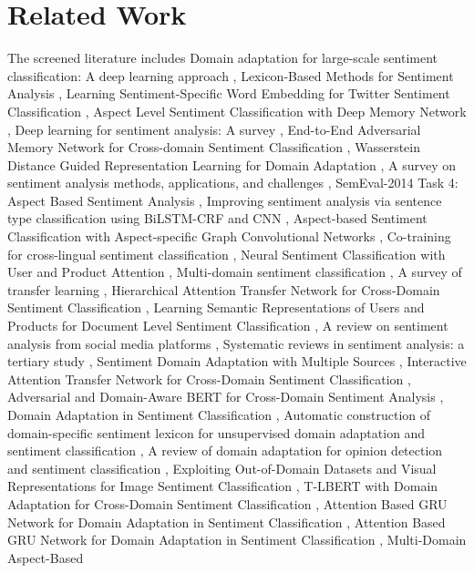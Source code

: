 \documentclass{article}
\begin{document}
\section{Related Work}
The screened literature includes Domain adaptation for large-scale sentiment classification: A deep learning approach \cite{glorot2011domainb905a703}, Lexicon-Based Methods for Sentiment Analysis \cite{taboada2011lexiconbasedc1eaa880}, Learning Sentiment-Specific Word Embedding for Twitter Sentiment Classification \cite{tang2014learning98a135fa}, Aspect Level Sentiment Classification with Deep Memory Network \cite{tang2016aspecte780e266}, Deep learning for sentiment analysis: A survey \cite{zhang2018deepc5431074}, End-to-End Adversarial Memory Network for Cross-domain Sentiment Classification \cite{li2017endtoendaadc69e5}, Wasserstein Distance Guided Representation Learning for Domain Adaptation \cite{shen2018wassersteinb4d359ec}, A survey on sentiment analysis methods, applications, and challenges \cite{wankhade2022surveybd7af33b}, SemEval-2014 Task 4: Aspect Based Sentiment Analysis \cite{pontiki2014semeval2014ddaa69ec}, Improving sentiment analysis via sentence type classification using BiLSTM-CRF and CNN \cite{chen2016improving0fec043c}, Aspect-based Sentiment Classification with Aspect-specific Graph Convolutional Networks \cite{zhang2019aspectbased9a079057}, Co-training for cross-lingual sentiment classification \cite{wan2009cotrainingf7cb4166}, Neural Sentiment Classification with User and Product Attention \cite{chen2016neural0df7d563}, Multi-domain sentiment classification \cite{li2008multidomain127a52f4}, A survey of transfer learning \cite{weiss2016surveydb7dbd8b}, Hierarchical Attention Transfer Network for Cross-Domain Sentiment Classification \cite{li2018hierarchical7d97e416}, Learning Semantic Representations of Users and Products for Document Level Sentiment Classification \cite{tang2015learninge778b40f}, A review on sentiment analysis from social media platforms \cite{rodrguezibez2023review357d59da}, Systematic reviews in sentiment analysis: a tertiary study \cite{ligthart2021systematic61a34904}, Sentiment Domain Adaptation with Multiple Sources \cite{wu2016sentiment3761d7c5}, Interactive Attention Transfer Network for Cross-Domain Sentiment Classification \cite{zhang2019interactive2aa8ed3c}, Adversarial and Domain-Aware BERT for Cross-Domain Sentiment Analysis \cite{du2020adversarial0e9baf5d}, Domain Adaptation in Sentiment Classification \cite{uribe2010domain6fd982cc}, Automatic construction of domain-specific sentiment lexicon for unsupervised domain adaptation and sentiment classification \cite{beigi2021automaticef9b17f2}, A review of domain adaptation for opinion detection and sentiment classification \cite{kasthuriarachchy2012review1bc25f5f}, Exploiting Out-of-Domain Datasets and Visual Representations for Image Sentiment Classification \cite{pournaras2021exploitingd282c12a}, T-LBERT with Domain Adaptation for Cross-Domain Sentiment Classification \cite{cao2023tlbert0f143b29}, Attention Based GRU Network for Domain Adaptation in Sentiment Classification \cite{pu2019attention5327674b}, Attention Based GRU Network for Domain Adaptation in Sentiment Classification \cite{pu2019attentione6b21266}, Multi-Domain Aspect-Based 
\end{document}
